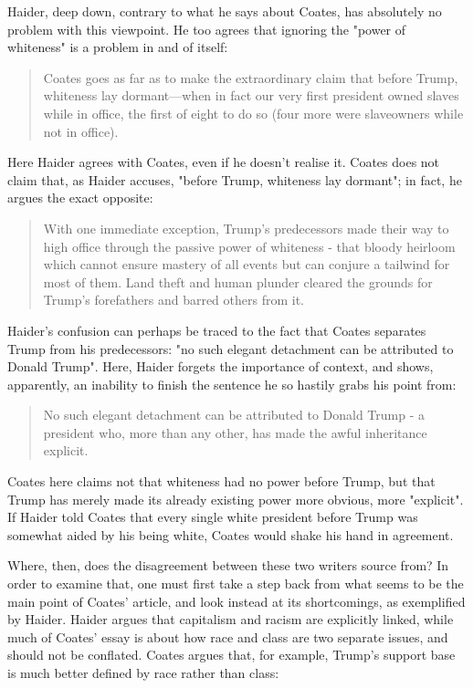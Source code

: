Haider, deep down, contrary to what he says about Coates, has absolutely no problem with this viewpoint. He too agrees that ignoring the "power of whiteness" is a problem in and of itself:

\begin{quote}
Coates goes as far as to make the extraordinary claim that before Trump, whiteness lay dormant—when in fact our very first president owned slaves while in office, the first of eight to do so (four more were slaveowners while not in office). \cite{haider}
\end{quote}

Here Haider agrees with Coates, even if he doesn't realise it. Coates does not claim that, as Haider accuses, "before Trump, whiteness lay dormant"; in fact, he argues the exact opposite:

\begin{quote}
With one immediate exception, Trump's predecessors made their way to high office through the passive power of whiteness - that bloody heirloom which cannot ensure mastery of all events but can conjure a tailwind for most of them. Land theft and human plunder cleared the grounds for Trump's forefathers and barred others from it. \cite{coates}
\end{quote}

Haider's confusion can perhaps be traced to the fact that Coates separates Trump from his predecessors: "no such elegant detachment can be attributed to Donald Trump". Here, Haider forgets the importance of context, and shows, apparently, an inability to finish the sentence he so hastily grabs his point from:

\begin{quote}
No such elegant detachment can be attributed to Donald Trump - a president who, more than any other, has made the awful inheritance explicit. \cite{coates}
\end{quote}

Coates here claims not that whiteness had no power before Trump, but that Trump has merely made its already existing power more obvious, more "explicit". If Haider told Coates that every single white president before Trump was somewhat aided by his being white, Coates would shake his hand in agreement.

Where, then, does the disagreement between these two writers source from? In order to examine that, one must first take a step back from what seems to be the main point of Coates' article, and look instead at its shortcomings, as exemplified by Haider. Haider argues that capitalism and racism are explicitly linked, while much of Coates' essay is about how race and class are two separate issues, and should not be conflated. Coates argues that, for example, Trump's support base is much better defined by race rather than class:

